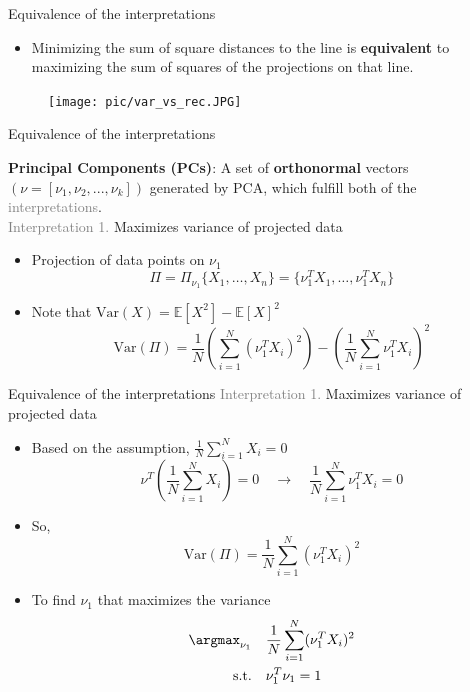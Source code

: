 \documentclass[serif, aspectratio=169]{beamer}
\begin{document}
\begin{frame}{Equivalence of the interpretations}
    \begin{itemize}
        \item Minimizing the sum of square distances to the line is \textbf{equivalent} to maximizing the sum of squares of the projections on that line.
    \end{itemize}
    \begin{figure}[htpb]
        \begin{center}
            \texttt{[image: pic/var\_vs\_rec.JPG]}
        \end{center}
    \end{figure}
\end{frame}

\begin{frame}{Equivalence of the interpretations}

    \textbf{Principal Components (PCs)}: A set of \textbf{orthonormal} vectors $(\nu = [\nu_1, \nu_2, ...,\nu_k])$ generated by PCA, which fulfill both of the \textcolor{gray}{interpretations}.\\[0.4cm]
    
    \textcolor{gray}{Interpretation 1.} Maximizes variance of projected data\\[0.3cm]
    \begin{itemize}
        \item Projection of data points on $\nu_1$
        $$\Pi = \Pi_{\nu_1} \{ X_{1}, \dots, X_{n} \} = \{ \nu_1^T X_{1}, \dots, \nu_1^T X_{n} \}$$
        \item Note that $\text{Var}(X) = \mathbb{E}[X^2] - \mathbb{E}[X]^2$
        $$\text{Var}(\Pi) = \frac{1}{N} \left( \sum_{i=1}^{N} (\nu_1^T X_i)^2 \right) - \left( \frac{1}{N} \sum_{i=1}^{N} \nu_1^T X_i \right)^2$$
    \end{itemize}
    
\end{frame}

\begin{frame}{Equivalence of the interpretations}
    \textcolor{gray}{Interpretation 1.} Maximizes variance of projected data\\[0.3cm]
    \begin{itemize}
        \item Based on the assumption, $\frac{1}{N} \sum_{i=1}^{N} X_i = 0$
        $$\nu^T(\frac{1}{N} \sum_{i=1}^{N} X_i) = 0 \quad \longrightarrow \quad \frac{1}{N} \sum_{i=1}^{N} \nu_1^T X_i = 0$$
        \item So,
        $$\text{Var}(\Pi) = \frac{1}{N} \sum_{i=1}^{N} (\nu_1^T X_i)^2$$
        \item To find $\nu_1$ that maximizes the variance
        $$\begin{aligned}
            \argmax_{\nu_1} \quad & \frac{1}{N} \sum_{i=1}^{N} (\nu_1^T X_i)^2\\
            \textrm{s.t.} \quad & \nu_1^T\nu_1 = 1\\
        \end{aligned}$$
    \end{itemize}
\end{frame}
\end{document}
